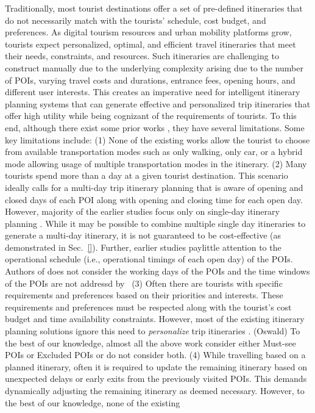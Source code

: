 Traditionally, most tourist destinations offer a set of pre-defined itineraries that do not necessarily match with the tourists' schedule, cost budget, and preferences. As digital tourism resources and urban mobility platforms grow, tourists expect personalized, optimal, and efficient travel itineraries that meet their needs, constraints, and resources. 
Such itineraries are challenging to construct manually due to the underlying complexity arising due to the number of POIs, varying travel costs and durations, entrance fees, opening hours, and different user interests. This creates an imperative need for intelligent itinerary planning systems that can generate effective and personalized trip itineraries that offer high utility while being cognizant of the requirements of tourists. To this end, although there exist some prior works \cite{chen2014automatic, vanzelst2016itinerary, taylor2018tour, vu2022branch, panagiotakis2024expectation, liu2024personalized, rambha2024optimized, lim2018personalized, bolzoni2014efficient}, they have several limitations. Some key limitations include: (1) None of the existing works allow the tourist to choose from available transportation modes such as only walking, only car, or a hybrid mode allowing usage of multiple transportation modes in the itinerary. (2) Many tourists spend more than a day at a given tourist destination. This scenario ideally calls for a multi-day trip itinerary planning that is aware of opening and closed days of each POI along with opening and closing time for each open day. However, majority of the earlier studies focus only on single-day itinerary planning \cite{taylor2018tour, vu2022branch, panagiotakis2024expectation}.  While it may be possible to combine multiple single day itineraries to generate a multi-day itinerary, it is not guaranteed to be cost-effective (as demonstrated in Sec.~\ref{}). Further, earlier studies paylittle attention to the operational schedule (i.e., operational timings of each open day) of the POIs. Authors of \cite{chen2014automatic, vanzelst2016itinerary, taylor2018tour, vu2022branch, panagiotakis2024expectation, liu2024personalized} does not consider the working days of the POIs and the time windows of the POIs are not addressd by~\cite{chen2014automatic, taylor2018tour, panagiotakis2024expectation} (3) Often there are tourists with specific requirements and preferences based on their priorities and interests. These requirements and preferences must be respected along with the tourist's cost budget and time availability constraints. However, most of the existing itinerary planning solutions ignore this need to \emph{personalize} trip itineraries \cite{chen2014automatic, vanzelst2016itinerary, taylor2018tour, vu2022branch, panagiotakis2024expectation, liu2024personalized, rambha2024optimized, lim2018personalized, bolzoni2014efficient}. (Oswald) To the best of our knowledge, almost all the above work consider either Must-see POIs or Excluded POIs or do not consider both. (4) While travelling based on a planned itinerary, often it is required to update the remaining itinerary based on unexpected delays or early exits from the previously visited POIs. This demands dynamically adjusting the remaining itinerary as deemed necessary. However, to the best of our knowledge, none of the existing 